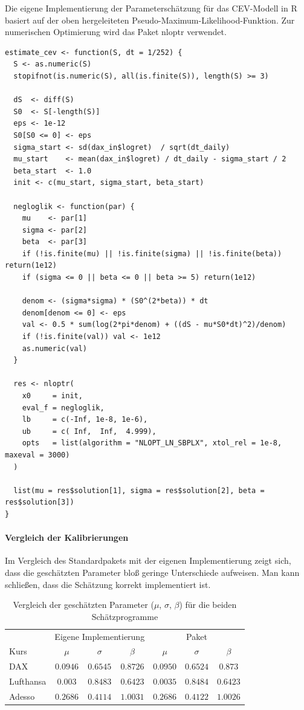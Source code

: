 \begin{bsp}
Die eigene Implementierung der Parameterschätzung für das CEV-Modell in R basiert auf der oben hergeleiteten 
Pseudo-Maximum-Likelihood-Funktion.
Zur numerischen Optimierung wird das Paket nloptr \cite{nlopt} verwendet.

\begin{lstlisting}
estimate_cev <- function(S, dt = 1/252) {
  S <- as.numeric(S)
  stopifnot(is.numeric(S), all(is.finite(S)), length(S) >= 3)
  
  dS  <- diff(S)
  S0  <- S[-length(S)]
  eps <- 1e-12
  S0[S0 <= 0] <- eps
  sigma_start <- sd(dax_in$logret)  / sqrt(dt_daily)
  mu_start    <- mean(dax_in$logret) / dt_daily - sigma_start / 2
  beta_start  <- 1.0
  init <- c(mu_start, sigma_start, beta_start) 
  
  negloglik <- function(par) {
    mu    <- par[1]
    sigma <- par[2]
    beta  <- par[3]
    if (!is.finite(mu) || !is.finite(sigma) || !is.finite(beta)) return(1e12)
    if (sigma <= 0 || beta <= 0 || beta >= 5) return(1e12)
    
    denom <- (sigma*sigma) * (S0^(2*beta)) * dt
    denom[denom <= 0] <- eps
    val <- 0.5 * sum(log(2*pi*denom) + ((dS - mu*S0*dt)^2)/denom)
    if (!is.finite(val)) val <- 1e12
    as.numeric(val)
  }
  
  res <- nloptr(
    x0     = init,
    eval_f = negloglik,
    lb     = c(-Inf, 1e-8, 1e-6),
    ub     = c( Inf,  Inf,  4.999),
    opts   = list(algorithm = "NLOPT_LN_SBPLX", xtol_rel = 1e-8, maxeval = 3000)
  )
  
  list(mu = res$solution[1], sigma = res$solution[2], beta = res$solution[3])
}
\end{lstlisting}


\paragraph{Vergleich der Kalibrierungen}
Im Vergleich des Standardpakets mit der eigenen Implementierung zeigt sich, dass die geschätzten Parameter
bloß geringe Unterschiede aufweisen. Man kann schließen, dass die Schätzung korrekt implementiert ist.

\begin{table}[H]
\centering
\caption{Vergleich der geschätzten Parameter ($\mu$, $\sigma$, $\beta$) für die beiden Schätzprogramme}
\label{tab:compare_models_ab}
\begin{tabular}{lcccccc}
\hline
 & \multicolumn{3}{c}{Eigene Implementierung} & \multicolumn{3}{c}{Paket} \\
\cline{2-4}\cline{5-7}
Kurs & $\mu$ & $\sigma$ & $\beta$ & $\mu$ & $\sigma$ & $\beta$ \\
\hline
DAX & $0.0946$ & $0.6545$ & $0.8726$ & $0.0950$ & $0.6524$ & $0.873$ \\
Lufthansa & $0.003$ & $0.8483$ & $0.6423$ & $0.0035$ & $0.8484$ & $0.6423$ \\
Adesso & $0.2686$ & $0.4114$ & $1.0031$ & $0.2686$ & $0.4122$ & $1.0026$ \\
\hline
\end{tabular}
\end{table}
\end{bsp}

